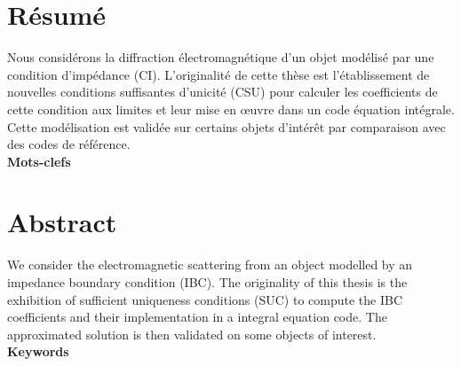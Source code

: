 \thispagestyle{empty}
\begin{center}
\Large
\textbf{\doctitlefr}
\end{center}
\section*{Résumé}
Nous considérons la diffraction électromagnétique d'un objet modélisé par une condition d'impédance (CI).
L'originalité de cette thèse est l'établissement de nouvelles conditions suffisantes d'unicité (CSU) pour calculer les coefficients de cette condition aux limites et leur mise en œuvre dans un code équation intégrale.
Cette modélisation est validée sur certains objets d'intérêt par comparaison avec des codes de référence.
\\

\textbf{Mots-clefs}


\dockeywordsfr

\hrulefill
\begin{center}
\Large
\textbf{\doctitleeng}
\end{center}
\section*{Abstract}
We consider the electromagnetic scattering from an object modelled by an impedance boundary condition (IBC).
The originality of this thesis is the exhibition of sufficient uniqueness conditions (SUC) to compute the IBC coefficients and their implementation in a integral equation code.
The approximated solution is then validated on some objects of interest.
\\

\textbf{Keywords}


\dockeywordseng
